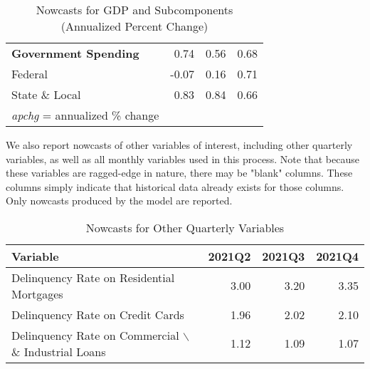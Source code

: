 \documentclass[11pt, letterpaper]{article}\usepackage[]{graphicx}\usepackage[]{color}
\begin{document}
\begin{table}[H]
\begin{tabular}{lrrr}
  \hspace{0mm} \textbf{Government Spending} & 0.74 & 0.56 & 0.68 \\ 
  \hspace{8mm}  Federal & -0.07 & 0.16 & 0.71 \\ 
  \hspace{8mm}  State \& Local & 0.83 & 0.84 & 0.66 \\ 
   \hline 
 \textit{apchg} = annualized \% change 
\end{tabular}
\endgroup
\caption{Nowcasts for GDP and Subcomponents (Annualized Percent Change)} 
\end{table}


We also report nowcasts of other variables of interest, including other quarterly variables, as well as all monthly variables used in this process. Note that because these variables are ragged-edge in nature, there may be "blank" columns. These columns simply indicate that historical data already exists for those columns. Only nowcasts produced by the model are reported.
\begin{table}[H]
\centering
\begingroup\fontsize{11pt}{13pt}\selectfont
\begin{tabular}{lrrr}
  \hline
Variable & 2021Q2 & 2021Q3 & 2021Q4 \\ 
  \hline
Delinquency Rate on Residential Mortgages & 3.00 & 3.20 & 3.35 \\ 
  Delinquency Rate on Credit Cards & 1.96 & 2.02 & 2.10 \\ 
  Delinquency Rate on Commercial $\backslash$\& Industrial Loans & 1.12 & 1.09 & 1.07 \\ 
   \hline
\end{tabular}
\endgroup
\caption{Nowcasts for Other Quarterly Variables} 
\end{table}
\end{document}
